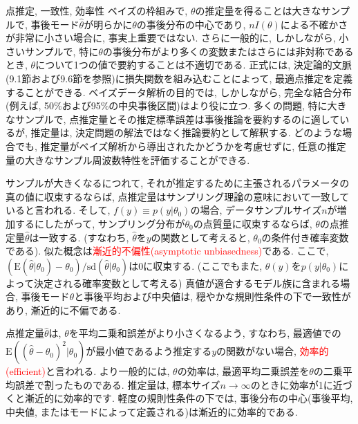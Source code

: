 \documentclass[10pt,dvipdfmx,a4]{beamer}
\newcommand{\tcr}[1]{\textcolor{red}{#1}}
\begin{document}

\begin{frame}{点推定, 一致性, 効率性}
ベイズの枠組みで, $\theta$の推定量を得ることは大きなサンプルで, 事後モード$\hat{\theta}$が明らかに$\theta$の事後分布の中心であり, $nI(\theta)$による不確かさが非常に小さい場合に, 事実上重要ではない.
さらに一般的に, しかしながら, 小さいサンプルで, 特に$\theta$の事後分布がより多くの変数またはさらには非対称であるとき, $\theta$について1つの値で要約することは不適切である.
正式には, 決定論的文脈(9.1節および9.6節を参照)に損失関数を組み込むことによって, 最適点推定を定義することができる.
ベイズデータ解析の目的では, しかしながら, 完全な結合分布(例えば, 50\%および95\%の中央事後区間)はより役に立つ.
多くの問題, 特に大きなサンプルで, 点推定量とその推定標準誤差は事後推論を要約するのに適しているが, 推定量は, 決定問題の解法ではなく推論要約として解釈する.
どのような場合でも, 推定量がベイズ解析から導出されたかどうかを考慮せずに, 任意の推定量の大きなサンプル周波数特性を評価することができる.
\end{frame}


\begin{frame}
サンプルが大きくなるにつれて, それが推定するために主張されるパラメータの真の値に収束するならば, 点推定量はサンプリング理論の意味において一致していると言われる.
そして, $f(y)\equiv p(y|\theta_0)$の場合, データサンプルサイズ$n$が増加するにしたがって, サンプリング分布が$\theta_0$の点質量に収束するならば, $\theta$の点推定量$\hat{\theta}$は一致する.
(すなわち, $\hat{\theta}$を$y$の関数として考えると, $\theta_0$の条件付き確率変数である).
似た概念は\tcr{漸近的不偏性(asymptotic unbiasedness)}である.
ここで, $(\text{E}(\hat{\theta}|\theta_0)-\theta_0)/\text{sd}(\hat{\theta}|\theta_0)$は0に収束する.
(ここでもまた, $\hat{\theta}(y)$を$p(y|\theta_0)$によって決定される確率変数として考える)
真値が適合するモデル族に含まれる場合, 事後モード$\theta$と事後平均および中央値は, 穏やかな規則性条件の下で一致性があり, 漸近的に不偏である.

点推定量$\hat{\theta}$は, $\theta$を平均二乗和誤差がより小さくなるよう, すなわち, 最適値での$\text{E}((\hat{\theta}-\theta_0)^2|\theta_0)$が最小値であるよう推定する$y$の関数がない場合, \tcr{効率的(efficient)}と言われる.
より一般的には, $\theta$の効率は, 最適平均二乗誤差を$\theta$の二乗平均誤差で割ったものである.
推定量は, 標本サイズ$n\rightarrow \infty$のときに効率が1に近づくと漸近的に効率的です.
軽度の規則性条件の下では, 事後分布の中心(事後平均, 中央値, またはモードによって定義される)は漸近的に効率的である.
\end{frame}
\end{document}
